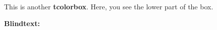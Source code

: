 \documentclass[a4paper]{chirri} %
\begin{document}
\layout                    %

\begin{headingbox}
This is another \textbf{tcolorbox}.
\tcblower
Here, you see the lower part of the box.
\end{headingbox}

\lipsum[1-3]
\textbf{Blindtext:}
\Blindtext
\end{document}

